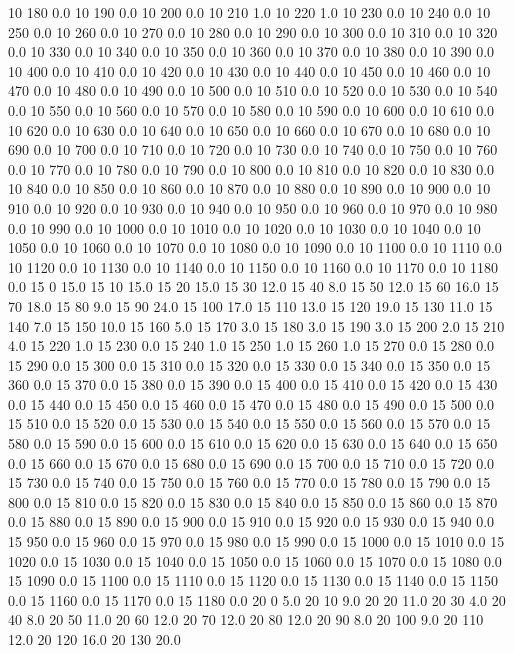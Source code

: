 10	180	0.0
10	190	0.0
10	200	0.0
10	210	1.0
10	220	1.0
10	230	0.0
10	240	0.0
10	250	0.0
10	260	0.0
10	270	0.0
10	280	0.0
10	290	0.0
10	300	0.0
10	310	0.0
10	320	0.0
10	330	0.0
10	340	0.0
10	350	0.0
10	360	0.0
10	370	0.0
10	380	0.0
10	390	0.0
10	400	0.0
10	410	0.0
10	420	0.0
10	430	0.0
10	440	0.0
10	450	0.0
10	460	0.0
10	470	0.0
10	480	0.0
10	490	0.0
10	500	0.0
10	510	0.0
10	520	0.0
10	530	0.0
10	540	0.0
10	550	0.0
10	560	0.0
10	570	0.0
10	580	0.0
10	590	0.0
10	600	0.0
10	610	0.0
10	620	0.0
10	630	0.0
10	640	0.0
10	650	0.0
10	660	0.0
10	670	0.0
10	680	0.0
10	690	0.0
10	700	0.0
10	710	0.0
10	720	0.0
10	730	0.0
10	740	0.0
10	750	0.0
10	760	0.0
10	770	0.0
10	780	0.0
10	790	0.0
10	800	0.0
10	810	0.0
10	820	0.0
10	830	0.0
10	840	0.0
10	850	0.0
10	860	0.0
10	870	0.0
10	880	0.0
10	890	0.0
10	900	0.0
10	910	0.0
10	920	0.0
10	930	0.0
10	940	0.0
10	950	0.0
10	960	0.0
10	970	0.0
10	980	0.0
10	990	0.0
10	1000	0.0
10	1010	0.0
10	1020	0.0
10	1030	0.0
10	1040	0.0
10	1050	0.0
10	1060	0.0
10	1070	0.0
10	1080	0.0
10	1090	0.0
10	1100	0.0
10	1110	0.0
10	1120	0.0
10	1130	0.0
10	1140	0.0
10	1150	0.0
10	1160	0.0
10	1170	0.0
10	1180	0.0
15	0	15.0
15	10	15.0
15	20	15.0
15	30	12.0
15	40	8.0
15	50	12.0
15	60	16.0
15	70	18.0
15	80	9.0
15	90	24.0
15	100	17.0
15	110	13.0
15	120	19.0
15	130	11.0
15	140	7.0
15	150	10.0
15	160	5.0
15	170	3.0
15	180	3.0
15	190	3.0
15	200	2.0
15	210	4.0
15	220	1.0
15	230	0.0
15	240	1.0
15	250	1.0
15	260	1.0
15	270	0.0
15	280	0.0
15	290	0.0
15	300	0.0
15	310	0.0
15	320	0.0
15	330	0.0
15	340	0.0
15	350	0.0
15	360	0.0
15	370	0.0
15	380	0.0
15	390	0.0
15	400	0.0
15	410	0.0
15	420	0.0
15	430	0.0
15	440	0.0
15	450	0.0
15	460	0.0
15	470	0.0
15	480	0.0
15	490	0.0
15	500	0.0
15	510	0.0
15	520	0.0
15	530	0.0
15	540	0.0
15	550	0.0
15	560	0.0
15	570	0.0
15	580	0.0
15	590	0.0
15	600	0.0
15	610	0.0
15	620	0.0
15	630	0.0
15	640	0.0
15	650	0.0
15	660	0.0
15	670	0.0
15	680	0.0
15	690	0.0
15	700	0.0
15	710	0.0
15	720	0.0
15	730	0.0
15	740	0.0
15	750	0.0
15	760	0.0
15	770	0.0
15	780	0.0
15	790	0.0
15	800	0.0
15	810	0.0
15	820	0.0
15	830	0.0
15	840	0.0
15	850	0.0
15	860	0.0
15	870	0.0
15	880	0.0
15	890	0.0
15	900	0.0
15	910	0.0
15	920	0.0
15	930	0.0
15	940	0.0
15	950	0.0
15	960	0.0
15	970	0.0
15	980	0.0
15	990	0.0
15	1000	0.0
15	1010	0.0
15	1020	0.0
15	1030	0.0
15	1040	0.0
15	1050	0.0
15	1060	0.0
15	1070	0.0
15	1080	0.0
15	1090	0.0
15	1100	0.0
15	1110	0.0
15	1120	0.0
15	1130	0.0
15	1140	0.0
15	1150	0.0
15	1160	0.0
15	1170	0.0
15	1180	0.0
20	0	5.0
20	10	9.0
20	20	11.0
20	30	4.0
20	40	8.0
20	50	11.0
20	60	12.0
20	70	12.0
20	80	12.0
20	90	8.0
20	100	9.0
20	110	12.0
20	120	16.0
20	130	20.0
